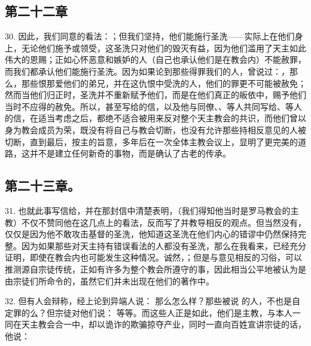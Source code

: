 \subsection{第二十二章}

30. 因此，我们同意的看法：；但我们坚持，他们能施行圣洗——实际上在他们身上，无论他们施予或领受，这圣洗只对他们的毁灭有益，因为他们滥用了天主如此伟大的恩赐；正如心怀恶意和嫉妒的人（自己也承认他们是在教会内）不能赦罪，而我们都承认他们能施行圣洗。因为如果论到那些得罪我们的人，曾说过：，那么，那些恨那爱他们的弟兄，并在这仇恨中受洗的人，他们的罪更不可能被赦免；然而当他们归正时，圣洗并不重新赋予他们，而是在他们真正的皈依中，赐予他们当时不应得的赦免。所以，甚至写给的信，以及他与同僚、、等人共同写给、等人的信，在适当考虑之后，都绝不适合被用来反对整个天主教会的共识，而他们曾以身为教会成员为荣，既没有将自己与教会切断，也没有允许那些持相反意见的人被切断，直到最后，按主的旨意，多年后在一次全体主教会议上，显明了更完美的道路，这并不是建立任何新奇的事物，而是确认了古老的传承。\par


\subsection{第二十三章。}

31. 也就此事写信给，并在那封信中清楚表明，（我们得知他当时是罗马教会的主教）不仅不赞同他在这几点上的看法，反而写了并教导相反的观点。但当然没有，仅仅是因为他不敢攻击基督的圣洗，他知道这圣洗在他们内心的错谬中仍然保持完整。因为如果那些对天主持有错误看法的人都没有圣洗，那么在我看来，已经充分证明，即使在教会内也可能发生这种情况。诚然，；但是与意见相反的习俗，可以推测源自宗徒传统，正如有许多为整个教会所遵守的事，因此相当公平地被认为是由宗徒们所命令的，虽然它们并未出现在他们的著作中。\par

32. 但有人会辩称，经上论到异端人说： 那么怎么样？那些被说 的人，不也是自定罪的么？但宗徒对他们说： 等等。而这些人正是如此，他们是主教，与本人一同在天主教会合一中，却以诡诈的欺骗掠夺产业，同时一直向百姓宣讲宗徒的话，他说：\par

